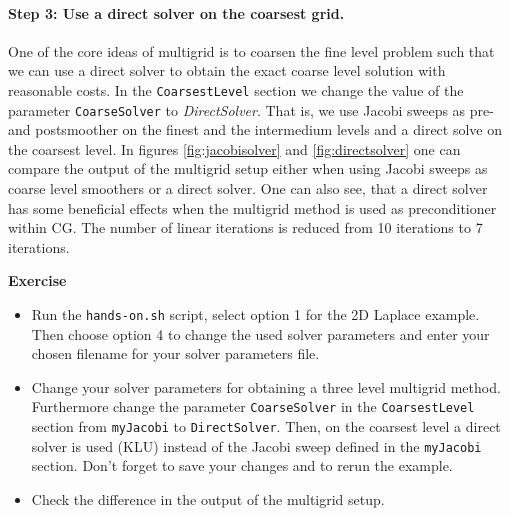\documentclass[12pt,a4paper]{article}
\begin{document}
\paragraph{Step 3: Use a direct solver on the coarsest grid.}
One of the core ideas of multigrid is to coarsen the fine level problem such that we can use a direct solver to obtain the exact coarse level solution with reasonable costs. In the \texttt{CoarsestLevel} section we change the value of the parameter \texttt{CoarseSolver} to \textit{DirectSolver}. That is, we use Jacobi sweeps as pre- and postsmoother on the finest and the intermedium levels and a direct solve on the coarsest level.
In figures \ref{fig:jacobisolver} and \ref{fig:directsolver} one can compare the output of the multigrid setup either when using Jacobi sweeps as coarse level smoothers or a direct solver. One can also see, that a direct solver has some beneficial effects when the multigrid method is used as preconditioner within CG. The number of linear iterations is reduced from 10 iterations to 7 iterations.

\begin{graybox}
 \textbf{Exercise}
 \begin{itemize}
  \item Run the \verb|hands-on.sh| script, select option 1 for the 2D Laplace example. Then choose option 4 to change the used solver parameters and enter your chosen filename for your solver parameters file.
  \item Change your solver parameters for obtaining a three level multigrid method. Furthermore change the parameter \verb|CoarseSolver| in the \verb|CoarsestLevel| section from \verb|myJacobi| to \verb|DirectSolver|. Then, on the coarsest level a direct solver is used (KLU) instead of the Jacobi sweep defined in the \verb|myJacobi| section. Don't forget to save your changes and to rerun the example.    
  \item Check the difference in the output of the multigrid setup.
 \end{itemize}
\end{graybox}
\end{document}
